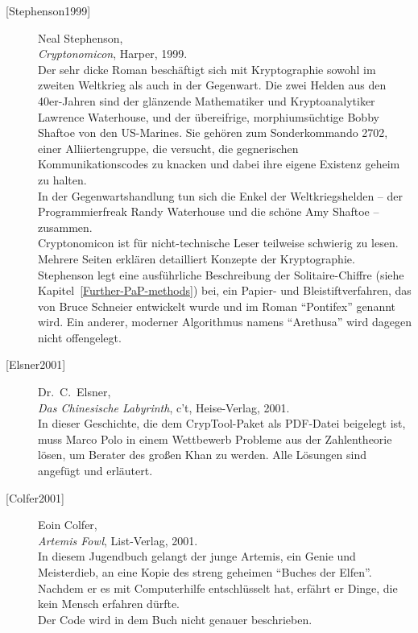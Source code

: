 \begin{refsegment}
\begin{description}
\item[\textrm{[Stephenson1999]}] 
    Neal Stephenson, \\
    {\em Cryptonomicon}, Harper, 1999. \\
    Der sehr dicke Roman beschäftigt sich mit Kryptographie sowohl im
    zweiten Weltkrieg als auch in der Gegenwart.
    Die zwei Helden aus den 40er-Jahren sind der glänzende Mathematiker und
    Kryptoanalytiker Lawrence Waterhouse, und der übereifrige,
    morphiumsüchtige Bobby Shaftoe von den US-Marines.
    Sie gehören zum Sonderkommando 2702, einer Alliiertengruppe, die
    versucht, die gegnerischen Kommunikationscodes zu knacken und dabei
    ihre eigene Existenz geheim zu halten. \\
    In der Gegenwartshandlung tun sich die Enkel der Weltkriegshelden -- der
    Programmierfreak Randy Waterhouse und die schöne Amy Shaftoe -- zusammen. \\
    Cryptonomicon ist für nicht-technische Leser teilweise schwierig zu
    lesen. Mehrere Seiten erklären detailliert Konzepte der Kryptographie.
    Stephenson legt eine ausführliche Beschreibung der Solitaire-Chiffre
    (siehe Kapitel~\ref{Further-PaP-methods}) bei, ein
    Papier- und Bleistiftverfahren,
    das von Bruce Schneier entwickelt wurde und im
    Roman "`Pontifex"' genannt wird. Ein anderer, moderner Algorithmus
    namens "`Arethusa"' wird dagegen nicht offengelegt.\\


\item[\textrm{[Elsner2001]}] 
    Dr.~C.~Elsner, \nopagebreak\\
    {\em Das Chinesische Labyrinth}, c't, Heise-Verlag, 2001. \\
    In dieser Geschichte, die dem CrypTool-Paket als PDF-Datei
    beigelegt ist, muss Marco Polo in einem Wettbewerb Probleme aus der
    Zahlentheorie lösen, um Berater des großen Khan zu werden. Alle Lösungen
    sind angefügt und erläutert.\\


\item[\textrm{[Colfer2001]}] 
    Eoin Colfer, \\
    {\em Artemis Fowl}, List-Verlag, 2001. \\
    In diesem Jugendbuch gelangt der junge Artemis, ein Genie und Meisterdieb,
    an eine Kopie des streng geheimen "`Buches der Elfen"'. Nachdem er es mit
    Computerhilfe entschlüsselt hat, erfährt er Dinge, die kein Mensch
    erfahren dürfte. \\
    Der Code wird in dem Buch nicht genauer beschrieben.\\



\end{description}
\end{refsegment}
